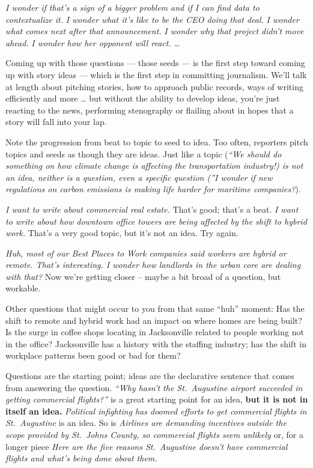 \documentclass[
  12pt,
  american,
  letterpaperpaper,
  extrafontsizes,onecolumn,openright
  ]{memoir}
\newlength{\rf}
\begin{document}
\emph{I wonder if that's a sign of a bigger problem and if I can find data to contextualize it.} \emph{I wonder what it's like to be the CEO doing that deal.} \emph{I wonder what comes next after that announcement.} \emph{I wonder why that project didn't move ahead.} \emph{I wonder how her opponent will react.} \emph{\ldots{}}

Coming up with those questions --- those seeds --- is the first step toward coming up with story ideas --- which is the first step in committing journalism. We'll talk at length about pitching stories, how to approach public records, ways of writing efficiently and more \ldots{} but without the ability to develop ideas, you're just reacting to the news, performing stenography or flailing about in hopes that a story will fall into your lap.

Note the progression from beat to topic to seed to idea. Too often, reporters pitch topics and seeds as though they are ideas. Just like a topic (\emph{\enquote{We should do something on how climate change is affecting the transportation industry!\emph{) is not an idea, neither is a question, even a specific question (}}I wonder if new regulations on carbon emissions is making life harder for maritime companies?}).

\emph{I want to write about commercial real estate.} That's good; that's a beat. \emph{I want to write about how downtown office towers are being affected by the shift to hybrid work.} That's a very good topic, but it's not an idea. Try again.

\emph{Huh, most of our Best Places to Work companies said workers are hybrid or remote. That's interesting. I wonder how landlords in the urban core are dealing with that?} Now we're getting closer -- maybe a bit broad of a question, but workable.

Other questions that might occur to you from that same \enquote{huh} moment: Has the shift to remote and hybrid work had an impact on where homes are being built? Is the surge in coffee shops locating in Jacksonville related to people working not in the office? Jacksonville has a history with the staffing industry; has the shift in workplace patterns been good or bad for them?

Questions are the starting point; ideas are the declarative sentence that comes from answering the question. \emph{\enquote{Why hasn't the St.~Augustine airport succeeded in getting commercial flights?}} is a great starting point for an idea, \textbf{but it is not in itself an idea.} \emph{Political infighting has doomed efforts to get commercial flights in St.~Augustine} is an idea. So is \emph{Airlines are demanding incentives outside the scope provided by St.~Johns County, so commercial flights seem unlikely} or, for a longer piece \emph{Here are the five reasons St.~Augustine doesn't have commercial flights and what's being done about them.}
\end{document}
